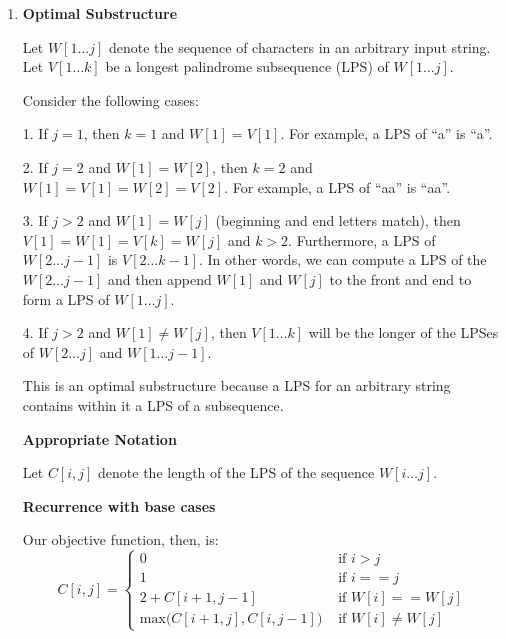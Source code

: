 \documentclass[a4paper]{report}
\begin{document}
\begin{enumerate}
    \pagebreak
    \bigskip
    \setcounter{equation}{0}
    \item 
      {\bf Optimal Substructure}

      Let $W[1\dots j]$ denote the sequence of characters in an arbitrary input string. Let $V[1\dots k]$
      be a longest palindrome subsequence (LPS) of $W[1\dots j]$. 

      Consider the following cases:

      1. If $j=1$, then $k=1$ and $W[1] = V[1]$. For example, a LPS of ``a'' is ``a''.

      2. If $j=2$ and $W[1] = W[2]$, then $k=2$ and $W[1] = V[1] = W[2] = V[2]$. For example, a LPS of ``aa'' is ``aa''.

      3. If $j>2$ and $W[1] = W[j]$ (beginning and end letters match), then $V[1] = W[1] = V[k] = W[j]$ and $k>2$. 
      Furthermore, a LPS of $W[2 \dots j-1]$ is $V[2\dots k-1]$. In other words, we can compute a LPS of the 
      $W[2 \dots j-1]$ and then append $W[1]$ and $W[j]$ to the front and end to form a LPS of $W[1\dots j]$.

      4. If $j>2$ and $W[1] \neq W[j]$, then $V[1\dots k]$ will be the longer of the LPSes of $W[2\dots j]$ and $W[1\dots j-1]$.

      This is an optimal substructure because a LPS for an arbitrary string contains within it a LPS of a subsequence.

      {\bf Appropriate Notation}

      Let $C[i, j]$ denote the length of the LPS of the sequence $W[i\dots j]$.

      {\bf Recurrence with base cases}

      Our objective function, then, is:
      \begin{displaymath}
        C[i,j] = \left\{
          \begin{array}{lr}
            0  &   \text{ if $i > j$}\\
            1  &   \text{ if $i == j$ }\\
            2 + C[i+1, j-1]  &  \text{ if $W[i] == W[j]$}\\
            \text{max($C[i+1,j], C[i,j-1]$)}  &  \text{ if $W[i] \neq W[j]$ }
          \end{array}
          \right.
        \end{displaymath} 



\end{enumerate}
\end{document}
